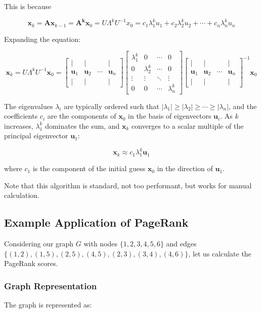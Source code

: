 This is because 

\[\textbf{x}_k=\textbf{Ax}_{k-1}=\textbf{A}^\textbf{k}\textbf{x}_0=U\Lambda^kU^{-1}x_0=c_1\lambda_1^ku_1+c_2\lambda_2^ku_2+\cdots+c_n\lambda_n^ku_n\]

Expanding the equation:

\[
\mathbf{x}_k = U\Lambda^kU^{-1}\mathbf{x}_0 = 
\begin{bmatrix}
| & | & & | \\
\mathbf{u}_1 & \mathbf{u}_2 & \cdots & \mathbf{u}_n \\
| & | & & |
\end{bmatrix}
\begin{bmatrix}
\lambda_1^k & 0 & \cdots & 0 \\
0 & \lambda_2^k & \cdots & 0 \\
\vdots & \vdots & \ddots & \vdots \\
0 & 0 & \cdots & \lambda_n^k
\end{bmatrix}
\begin{bmatrix}
| & | & & | \\
\mathbf{u}_1 & \mathbf{u}_2 & \cdots & \mathbf{u}_n \\
| & | & & |
\end{bmatrix}^{-1}
\mathbf{x}_0
\]

The eigenvalues \( \lambda_i \) are typically ordered such that \( |\lambda_1| \geq |\lambda_2| \geq \cdots \geq |\lambda_n| \), and the coefficients \( c_i \) are the components of \( \mathbf{x}_0 \) in the basis of eigenvectors \( \mathbf{u}_i \). As \( k \) increases, \( \lambda_1^k \) dominates the sum, and \( \mathbf{x}_k \) converges to a scalar multiple of the principal eigenvector \( \mathbf{u}_1 \):

\[
\mathbf{x}_k \approx c_1\lambda_1^k\mathbf{u}_1
\]

where \( c_1 \) is the component of the initial guess \( \mathbf{x}_0 \) in the direction of \( \mathbf{u}_1 \).


Note that this algorithm is standard, not too performant, but works for manual calculation.

\subsection*{Example Application of PageRank}
Considering our graph \( G \) with nodes \( \{1,2,3,4,5,6\} \) and edges \( \{(1,2), (1,5), (2,5), (4,5), (2,3), (3,4), (4,6)\} \), let us calculate the PageRank scores.

\subsubsection*{Graph Representation}
The graph is represented as:

